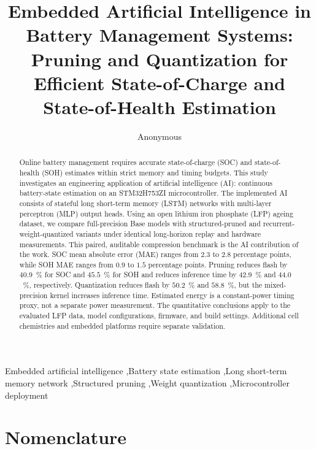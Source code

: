 \documentclass[review]{elsarticle}
\date{}
\begin{document}
\linenumbers
\begin{frontmatter}
\title{Embedded Artificial Intelligence in Battery Management Systems: Pruning and Quantization for Efficient State-of-Charge and State-of-Health Estimation}
\author{Anonymous}
\begin{abstract}
Online battery management requires accurate state-of-charge (SOC) and state-of-health (SOH) estimates within strict memory and timing budgets. This study investigates an engineering application of artificial intelligence (AI): continuous battery-state estimation on an STM32H753ZI microcontroller. The implemented AI consists of stateful long short-term memory (LSTM) networks with multi-layer perceptron (MLP) output heads. Using an open lithium iron phosphate (LFP) ageing dataset, we compare full-precision Base models with structured-pruned and recurrent-weight-quantized variants under identical long-horizon replay and hardware measurements. This paired, auditable compression benchmark is the AI contribution of the work. SOC mean absolute error (MAE) ranges from $2.3$ to $2.8$ percentage points, while SOH MAE ranges from $0.9$ to $1.5$ percentage points. Pruning reduces flash by $40.9$~\% for SOC and $45.5$~\% for SOH and reduces inference time by $42.9$~\% and $44.0$~\%, respectively. Quantization reduces flash by $50.2$~\% and $58.8$~\%, but the mixed-precision kernel increases inference time. Estimated energy is a constant-power timing proxy, not a separate power measurement. The quantitative conclusions apply to the evaluated LFP data, model configurations, firmware, and build settings. Additional cell chemistries and embedded platforms require separate validation.
\end{abstract}
\begin{keyword}
Embedded artificial intelligence \sep Battery state estimation \sep Long short-term memory network \sep Structured pruning \sep Weight quantization \sep Microcontroller deployment
\end{keyword}
\end{frontmatter}
\section*{Nomenclature}
\small
\end{document}
